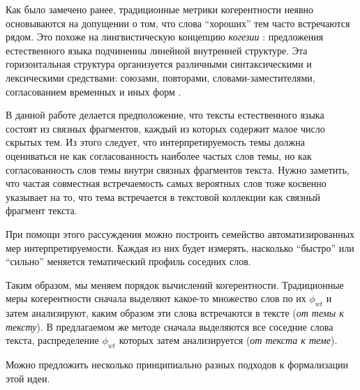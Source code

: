 Как было замечено ранее, традиционные метрики когерентности неявно основываются на допущении о том, что слова ``хороших'' тем часто встречаются рядом. Это похоже на лингвистическую концепцию \textit{когезии} \cite{halliday1976cohesion}: предложения естественного языка подчиненны линейной внутренней структуре. Эта горизонтальная структура организуется 
различными синтаксическими и лексическими средствами: союзами, повторами, словами-заместителями, согласованием временных и иных форм \cite{kazachenko2009}.

В данной работе делается предположение, что тексты естественного языка состоят из связных фрагментов, каждый из которых содержит малое число скрытых тем. Из этого следует, что интерпретируемость темы должна оцениваться не как согласованность наиболее частых слов темы, но как согласованность слов темы внутри связных фрагментов текста. Нужно заметить, что частая совместная встречаемость самых вероятных слов тоже косвенно указывает на то, что тема встречается в текстовой коллекции как связный фрагмент текста.

При помощи этого рассуждения можно построить семейство автоматизированных мер интерпретируемости. Каждая из них будет измерять, насколько ``быстро'' или ``сильно'' меняется тематический профиль соседних слов. 

Таким образом, мы меняем порядок вычислений когерентности. Традиционные меры когерентности сначала выделяют какое-то множество слов по их $\phi_{wt}$ и затем анализируют, каким образом эти слова встречаются в тексте (\emph{от темы к тексту}). В предлагаемом же методе сначала выделяются все соседние слова текста, распределение $\phi_{wt}$ которых затем анализируется (\emph{от текста к теме}).

Можно предложить несколько принципиально разных подходов к формализации этой идеи.





